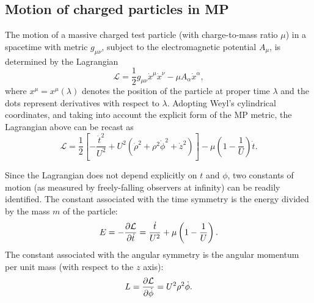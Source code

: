 \subsection{Motion of charged particles in MP}
\label{sec:motion}

The motion of a massive charged test particle (with charge-to-mass ratio $\mu$) in a spacetime with metric $g_{\mu \nu}$, subject to the electromagnetic potential $A_{\mu}$, is determined by the Lagrangian
\begin{equation}
    \mathcal{L} = \frac{1}{2}g_{\mu \nu}\dot{x}^\mu \dot{x}^\nu - \mu A_{\alpha}\dot{x}^\alpha,
    \label{eq:lagrangian_for_charged_particle}
\end{equation}
where $x^{\mu} = x^{\mu}(\lambda)$ denotes the position of the particle at proper time $\lambda$ and the dots represent derivatives with respect to $\lambda$. Adopting Weyl's cylindrical coordinates, and taking into account the explicit form of the MP metric, the Lagrangian above can be recast as~\cite{RYZNER2015}
%
\begin{equation}
    \mathcal{L} = \frac{1}{2}\left[-\frac{\dot{t}^2}{U^2} + U^2\left( \dot{\rho}^2 + \rho^2\dot{\phi}^2 + \dot{z}^2 \right) \right] - \mu\left(1-\frac{1}{U}\right)\dot{t}.
    \label{eq:explicit_lagrangian_for_charged_particle}
\end{equation}
%

Since the Lagrangian does not depend explicitly on $t$ and $\phi$, two constants of motion (as measured by freely-falling observers at infinity) can be readily identified. The constant associated with the time symmetry is the energy divided by the mass $m$ of the particle:
%
\begin{equation}
    E = -\frac{\partial \mathcal{L}}{\partial \dot{t}} = \frac{\dot{t}}{U^2} + \mu\left(1-\frac{1}{U}\right).
    \label{eq:conserved_energy}
\end{equation}
%
The constant associated with the angular symmetry is the angular momentum per unit mass (with respect to the $z$ axis):
%
\begin{equation}
    L = \frac{\partial \mathcal{L}}{\partial \dot{\phi}} = U^2 \rho^2 \dot{\phi}.
    \label{eq:conserved_momentum}
\end{equation}

